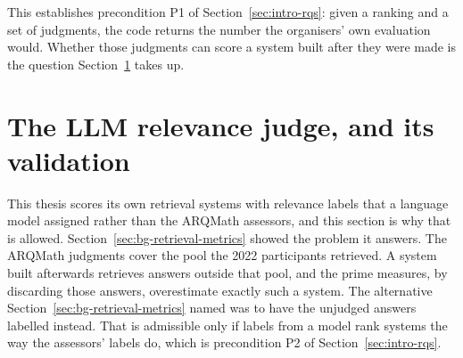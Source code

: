 This establishes precondition P1 of Section~\ref{sec:intro-rqs}: given a ranking
and a set of judgments, the code returns the number the organisers' own evaluation
would. Whether those judgments can score a system built after they were made is the
question Section~\ref{sec:met-judge-validation} takes up.


\section{The LLM relevance judge, and its validation}\label{sec:met-judge-validation}

This thesis scores its own retrieval systems with relevance labels that a language
model assigned rather than the ARQMath assessors, and this section is why that is
allowed. Section~\ref{sec:bg-retrieval-metrics} showed the problem it answers. The
ARQMath judgments cover the pool the 2022 participants retrieved. A system built
afterwards retrieves answers outside that pool, and the prime measures, by discarding
those answers, overestimate exactly such a system. The alternative
Section~\ref{sec:bg-retrieval-metrics} named was to have the unjudged answers
labelled instead. That is admissible only if labels from a model rank systems the way
the assessors' labels do, which is precondition P2 of Section~\ref{sec:intro-rqs}.

